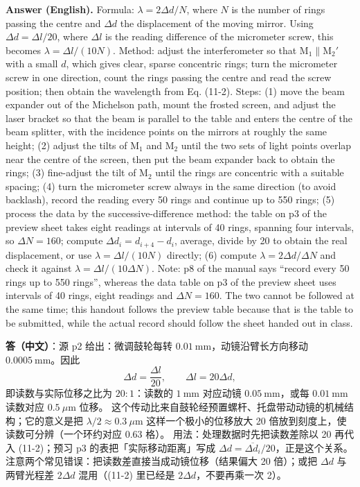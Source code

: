 \documentclass[11pt]{ctexart}
\newcommand{\Dl}{d}
\newcommand{\qaneed}[1]{\needspace{#1\textheight}}
\begin{document}
\textbf{Answer (English).} Formula: $\lambda=2\Delta\Dl/N$, where $N$ is the number of rings passing the centre and $\Delta\Dl$ the displacement of the moving mirror. Using $\Delta\Dl=\Delta l/20$, where $\Delta l$ is the reading difference of the micrometer screw, this becomes $\lambda=\Delta l/(10N)$.
Method: adjust the interferometer so that M$_1\parallel$M$_2'$ with a small $\Dl$, which gives clear, sparse concentric rings; turn the micrometer screw in one direction, count the rings passing the centre and read the screw position; then obtain the wavelength from Eq. (11-2).
Steps: (1) move the beam expander out of the Michelson path, mount the frosted screen, and adjust the laser bracket so that the beam is parallel to the table and enters the centre of the beam splitter, with the incidence points on the mirrors at roughly the same height; (2) adjust the tilts of M$_1$ and M$_2$ until the two sets of light points overlap near the centre of the screen, then put the beam expander back to obtain the rings; (3) fine-adjust the tilt of M$_2$ until the rings are concentric with a suitable spacing; (4) turn the micrometer screw always in the same direction (to avoid backlash), record the reading every 50 rings and continue up to 550 rings; (5) process the data by the successive-difference method: the table on p3 of the preview sheet takes eight readings at intervals of 40 rings, spanning four intervals, so $\Delta N=160$; compute $\Delta\Dl_i=\Dl_{i+4}-\Dl_i$, average, divide by 20 to obtain the real displacement, or use $\lambda=\Delta l/(10N)$ directly; (6) compute $\lambda=2\Delta\Dl/\Delta N$ and check it against $\lambda=\Delta l/(10\Delta N)$.
Note: p8 of the manual says ``record every 50 rings up to 550 rings'', whereas the data table on p3 of the preview sheet uses intervals of 40 rings, eight readings and $\Delta N=160$. The two cannot be followed at the same time; this handout follows the preview table because that is the table to be submitted, while the actual record should follow the sheet handed out in class.

\qaneed{0.68}


\textbf{答（中文）}：源 p2 给出：微调鼓轮每转 $0.01\ \mathrm{mm}$，动镜沿臂长方向移动 $0.0005\ \mathrm{mm}$。因此
\[
  \Delta\Dl=\frac{\Delta l}{20},\qquad \Delta l=20\Delta\Dl ,
\]
即读数与实际位移之比为 $20:1$：读数的 $1\ \mathrm{mm}$ 对应动镜 $0.05\ \mathrm{mm}$，或每 $0.01\ \mathrm{mm}$ 读数对应 $0.5\ \mu\mathrm{m}$ 位移。
这个传动比来自鼓轮经预置螺杆、托盘带动动镜的机械结构；它的意义是把 $\lambda/2\approx0.3\ \mu\mathrm{m}$ 这样一个极小的位移放大 20 倍放到刻度上，使读数可分辨（一个环约对应 $0.63$ 格）。
用法：处理数据时先把读数差除以 20 再代入 (11-2)；预习 p3 的表把「实际移动距离」写成 $\Delta\Dl=\overline{\Delta\Dl_i}/20$，正是这个关系。注意两个常见错误：把读数差直接当成动镜位移（结果偏大 20 倍）；或把 $\Delta\Dl$ 与两臂光程差 $2\Delta\Dl$ 混用（(11-2) 里已经是 $2\Delta\Dl$，不要再乘一次 2）。
\end{document}

